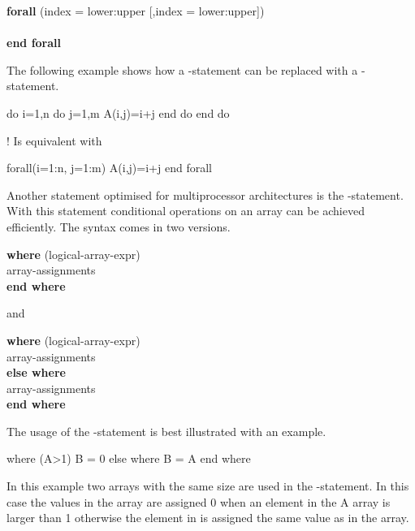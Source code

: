 \begin{fsyntax}
\textbf{forall} (index = lower:upper [,index = lower:upper])\\
\ftab [body]\\
\textbf{end forall}
\end{fsyntax}

The following example shows how a -statement can be replaced with a -statement.

\begin{fortrancodeenv}
do i=1,n
    do j=1,m
        A(i,j)=i+j
    end do
end do

! Is equivalent with

forall(i=1:n, j=1:m)
    A(i,j)=i+j
end forall
\end{fortrancodeenv}

Another statement optimised for multiprocessor architectures is the -statement. With this statement conditional operations on an array can be achieved efficiently. The syntax comes in two versions.

\begin{fsyntax}
\textbf{where} (logical-array-expr)\\
\ftab array-assignments\\
\textbf{end where}
\end{fsyntax}

and

\begin{fsyntax}
\textbf{where} (logical-array-expr)\\
\ftab array-assignments\\
\textbf{else where}\\
\ftab array-assignments\\
\textbf{end where}
\end{fsyntax}

The usage of the -statement is best illustrated with an example.

\begin{fortrancodeenv}
where (A>1)
    B = 0
else where
    B = A
end where
\end{fortrancodeenv}

In this example two arrays with the same size are used in the -statement. In this case the values in the  array are assigned 0 when an element in the A array is larger than 1 otherwise the element in  is assigned the same value as in the  array.


